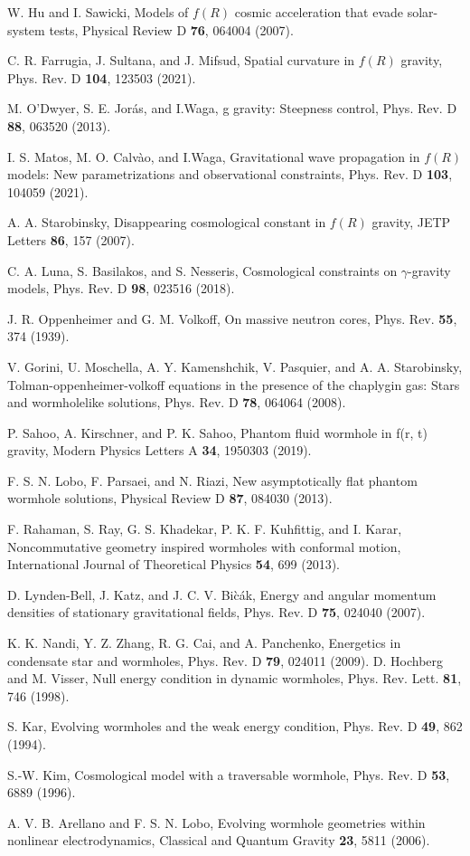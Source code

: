 \begin{thebibliography}{87}
 W. Hu and I. Sawicki, Models of $f(R)$ cosmic acceleration that evade solar-system tests, Physical Review D \textbf{76}, 064004 (2007).

 C. R. Farrugia, J. Sultana, and J. Mifsud, Spatial curvature in $f(R)$ gravity, Phys. Rev. D \textbf{104}, 123503 (2021).

 M. O'Dwyer, S. E. Jor\'as, and I.Waga, g gravity: Steepness control, Phys. Rev. D \textbf{88}, 063520 (2013).

 I. S. Matos, M. O. Calv\`ao, and I.Waga, Gravitational wave propagation in $f(R)$ models: New parametrizations and observational
constraints, Phys. Rev. D \textbf{103}, 104059 (2021).

 A. A. Starobinsky, Disappearing cosmological constant in $f(R)$ gravity, JETP Letters \textbf{86}, 157 (2007).

 C. A. Luna, S. Basilakos, and S. Nesseris, Cosmological constraints on $\gamma$-gravity models, Phys. Rev. D \textbf{98}, 023516 (2018).

 J. R. Oppenheimer and G. M. Volkoff, On massive neutron cores, Phys. Rev. \textbf{55}, 374 (1939).

 V. Gorini, U. Moschella, A. Y. Kamenshchik, V. Pasquier, and A. A. Starobinsky, Tolman-oppenheimer-volkoff equations in
the presence of the chaplygin gas: Stars and wormholelike solutions, Phys. Rev. D \textbf{78}, 064064 (2008).

 P. Sahoo, A. Kirschner, and P. K. Sahoo, Phantom fluid wormhole in f(r, t) gravity, Modern Physics Letters A \textbf{34}, 1950303 (2019).

 F. S. N. Lobo, F. Parsaei, and N. Riazi, New asymptotically flat phantom wormhole solutions, Physical Review D \textbf{87}, 084030 (2013).

 F. Rahaman, S. Ray, G. S. Khadekar, P. K. F. Kuhfittig, and I. Karar, Noncommutative geometry inspired wormholes with
conformal motion, International Journal of Theoretical Physics \textbf{54}, 699 (2013).

 D. Lynden-Bell, J. Katz, and J. C. V. Bi\`c\'ak, Energy and angular momentum densities of stationary gravitational fields, Phys.
Rev. D \textbf{75}, 024040 (2007).

 K. K. Nandi, Y. Z. Zhang, R. G. Cai, and A. Panchenko, Energetics in condensate star and wormholes, Phys. Rev. D \textbf{79}, 024011
(2009).
 D. Hochberg and M. Visser, Null energy condition in dynamic wormholes, Phys. Rev. Lett. \textbf{81}, 746 (1998).

 S. Kar, Evolving wormholes and the weak energy condition, Phys. Rev. D \textbf{49}, 862 (1994).

 S.-W. Kim, Cosmological model with a traversable wormhole, Phys. Rev. D \textbf{53}, 6889 (1996).

 A. V. B. Arellano and F. S. N. Lobo, Evolving wormhole geometries within nonlinear electrodynamics, Classical and Quantum
Gravity \textbf{23}, 5811 (2006).
\end{thebibliography}
 